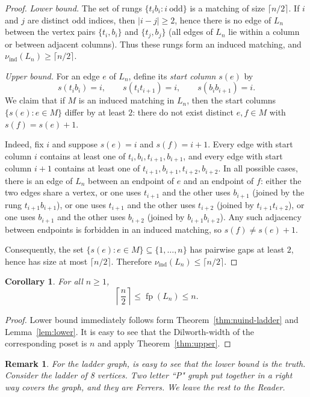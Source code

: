 \documentclass[12pt]{amsart}
\newtheorem{corollary}[theorem]{Corollary}
\newtheorem{remark}[theorem]{Remark}
\newcommand{\fp}{\operatorname{fp}}
\newcommand{\ind}{\operatorname{ind}}
\begin{document}
\begin{proof}
\emph{Lower bound.}
The set of rungs $\{t_ib_i : i\ \text{odd}\}$ is a matching of size $\lceil n/2\rceil$.
If $i$ and $j$ are distinct odd indices, then $|i-j|\ge 2$, hence there is no edge of $L_n$ between the vertex pairs
$\{t_i,b_i\}$ and $\{t_j,b_j\}$ (all edges of $L_n$ lie within a column or between adjacent columns).
Thus these rungs form an induced matching, and $\nu_{\ind}(L_n)\ge \lceil n/2\rceil$.

\emph{Upper bound.}
For an edge $e$ of $L_n$, define its \emph{start column} $s(e)$ by
\[
s(t_ib_i)=i,\qquad s(t_it_{i+1})=i,\qquad s(b_ib_{i+1})=i.
\]
We claim that if $M$ is an induced matching in $L_n$, then the start columns $\{s(e):e\in M\}$ differ by at least $2$:
there do not exist distinct $e,f\in M$ with $s(f)=s(e)+1$.

Indeed, fix $i$ and suppose $s(e)=i$ and $s(f)=i+1$.
Every edge with start column $i$ contains at least one of $t_i,b_i,t_{i+1},b_{i+1}$, and every edge with start column $i+1$
contains at least one of $t_{i+1},b_{i+1},t_{i+2},b_{i+2}$.
In all possible cases, there is an edge of $L_n$ between an endpoint of $e$ and an endpoint of $f$:
either the two edges share a vertex, or one uses $t_{i+1}$ and the other uses $b_{i+1}$ (joined by the rung $t_{i+1}b_{i+1}$),
or one uses $t_{i+1}$ and the other uses $t_{i+2}$ (joined by $t_{i+1}t_{i+2}$), or one uses $b_{i+1}$ and the other uses $b_{i+2}$
(joined by $b_{i+1}b_{i+2}$).
Any such adjacency between endpoints is forbidden in an induced matching, so $s(f)\neq s(e)+1$.

Consequently, the set $\{s(e):e\in M\}\subseteq\{1,\dots,n\}$ has pairwise gaps at least $2$, hence has size at most $\lceil n/2\rceil$.
Therefore $\nu_{\ind}(L_n)\le \lceil n/2\rceil$.
\end{proof}

\begin{corollary}\label{cor:fp-ladder-lb}
For all $n\ge 1$,
\[
\left\lceil\frac{n}{2}\right\rceil \le \fp(L_n)\le n.
\]
\end{corollary}

\begin{proof}
Lower bound immediately follows form Theorem~\ref{thm:nuind-ladder} and Lemma~\ref{lem:lower}. It is easy to see that the
Dilworth-width of the corresponding poset is $n$ and apply Theorem~\ref{thm:upper}.
\end{proof}

\begin{remark}
For the ladder graph, is easy to see that the lower bound is the truth. Consider the ladder of 8 vertices. Two letter ``P" graph put together in a right way covers the graph, and they are Ferrers. We leave the rest to the Reader.
\end{remark}
\end{document}
